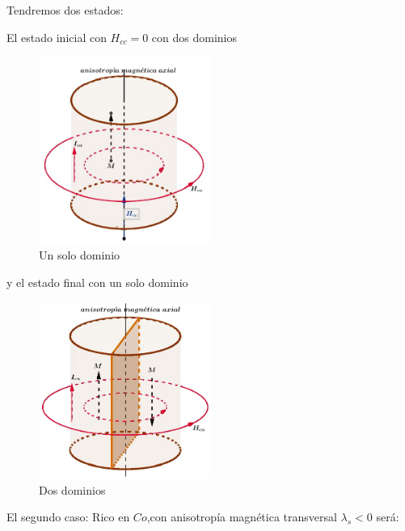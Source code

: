 Tendremos dos estados:

El estado inicial con $H_{cc}=0$ con dos dominios
\begin{figure}[H]
    \centering
    \includegraphics[width=0.5\textwidth]{./Figures/fig323}
	\caption{Un solo dominio}
	\label{fig:323}
\end{figure}

y el estado final con un solo dominio

\begin{figure}[H]
    \centering
    \includegraphics[width=0.5\textwidth]{./Figures/fig324}
	\caption{Dos dominios}
	\label{fig:324}
\end{figure}

El segundo caso: Rico en $Co$,con anisotropía magnética transversal $\lambda_{s}<0$ será:

